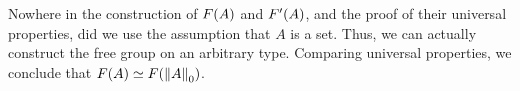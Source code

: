 \documentclass[hott-all.tex]{subfiles}
\begin{document}
% 
% 
\begin{rmk}
  Nowhere in the construction of $\freegroup{A}$ and $\freegroupx{A}$, and the proof of their universal properties, did we use the assumption that $A$ is a set.
  Thus, we can actually construct the free group on an arbitrary type.
  Comparing universal properties, we conclude that $\eqv{\freegroup{A}}{\freegroup{\trunc0A}}$.
\end{rmk}
% 
% 
\end{document}

